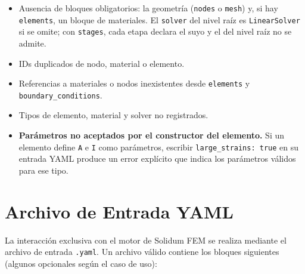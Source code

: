 \documentclass[11pt,oneside]{report}
\begin{document}
\begin{itemize}
  \item Ausencia de bloques obligatorios: la geometría (\texttt{nodes} o \texttt{mesh}) y, si hay \texttt{elements}, un bloque de materiales. El \texttt{solver} del nivel raíz es \texttt{LinearSolver} si se omite; con \texttt{stages}, cada etapa declara el suyo y el del nivel raíz no se admite.
  \item IDs duplicados de nodo, material o elemento.
  \item Referencias a materiales o nodos inexistentes desde \texttt{elements} y \texttt{boundary\_\allowbreak{}conditions}.
  \item Tipos de elemento, material y solver no registrados.
  \item \textbf{Parámetros no aceptados por el constructor del elemento.} Si un elemento define \texttt{A} e \texttt{I} como parámetros, escribir \texttt{large\_\allowbreak{}strains: true} en su entrada YAML produce un error explícito que indica los parámetros válidos para ese tipo.
\end{itemize}


\newpage

\chapter{Archivo de Entrada YAML}
\label{cap:3}



La interacción exclusiva con el motor de Solidum FEM se realiza mediante el archivo de entrada \texttt{.yaml}. Un archivo válido contiene los bloques siguientes (algunos opcionales según el caso de uso):
\end{document}
